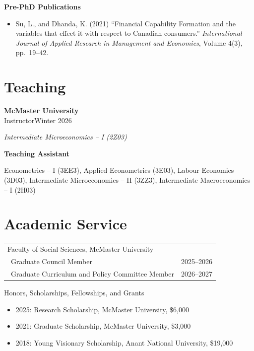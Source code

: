 \documentclass[11pt]{article}
\makeatletter
\newcommand{\instructor}[4]{%
  \noindent
  \textbf{#1} \\
  #2\hfill#3\par
  \noindent\textit{#4}\par
  \vspace{6pt}%
}
\newcommand{\serviceentry}[6]{%
  \noindent
  \begin{tabularx}{\linewidth}{@{}X r@{}}
    {#1} & \\
    \textbullet\ #2 & #3 \\
    \textbullet\ #4 & #5 \\
  \end{tabularx}%
  \vspace{4pt}%
}
\newcommand{\ta}[3]{%
  \noindent
  \textbf{#1}\par
  \noindent #2\par
  \noindent\textit{#3}\par
  \vspace{4pt}%
}
\newenvironment{cvlist}
  {\begin{itemize}[leftmargin=1.2em,itemsep=4pt,topsep=2pt,parsep=0pt]}
  {\end{itemize}}
\makeatother
\begin{document}
\noindent\textbf{Pre-PhD Publications}
\begin{cvlist}
  \item Su, L., and Dhanda, K. (2021) ``Financial Capability Formation and the variables that effect it with
respect to Canadian consumers.''
        \textit{International Journal of Applied
Research in Management and Economics}, Volume 4(3), pp.\ 19--42.
  
\end{cvlist}

\section{Teaching}

\instructor
    {McMaster University}
    {Instructor}
    {Winter 2026}
    {Intermediate Microeconomics -- I (2Z03)}
    

\ta{Teaching Assistant}
   {Econometrics -- I (3EE3), Applied Econometrics (3E03), Labour Economics (3D03), Intermediate Microeconomics -- II (3ZZ3), Intermediate Macroeconomics -- I (2H03)}
   {}

\section{Academic Service}

\serviceentry
  {Faculty of Social Sciences, McMaster University}
  {Graduate Council Member}
  {2025--2026}
  {Graduate Curriculum and Policy Committee Member}
  {2026--2027}
  

\section{Honors, Scholarships, Fellowships, and Grants}
\begin{cvlist}
  \item 2025: Research Scholarship, McMaster University, \$6{,}000
  \item 2021: Graduate Scholarship, McMaster University, \$3{,}000
  \item 2018: Young Visionary Scholarship, Anant National University, \$19{,}000 

\end{cvlist}

\end{document}
